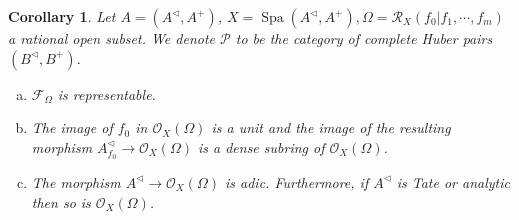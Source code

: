 \documentclass[8pt]{article}
\numberwithin{equation}{section}
\newtheorem{corollary}{Corollary} [subsection]
\DeclareMathOperator{\Hom}{Hom}
\DeclareMathOperator{\Spa}{Spa}
\newcommand{\Ouv}{\mathscr{O}}
\newcommand{\cR}[0]{\mathcal{R}}
\newcommand{\sep}[0]{\:|\:}
\newcommand{\cO}[0]{\mathcal{O}}
\newcommand{\cF}[0]{\mathcal{F}}
\begin{document}
\begin{corollary}
    \label{corollary_20_3}
    Let $A=(A^\triangleleft,A^+)$, $X=\Spa(A^\triangleleft,A^+),\Omega = \cR_X(f_0|f_1,\cdots,f_m)$ a rational open subset. %
    We denote $\mathcal{P}$ to be the category of complete Huber pairs $(B^\triangleleft,B^+)$.
    \begin{enumerate}[a.]
        \item $\cF_\Omega$ is representable.
        \item The image of $f_0$ in $\cO_X(\Omega)$ is a unit and the image of the resulting morphism $A_{f_0}^\triangleleft\to\cO_X(\Omega)$ is a dense subring of $\cO_X(\Omega)$.
        \item The morphism $A^\triangleleft\to\cO_X(\Omega)$ is adic. Furthermore, if $A^\triangleleft$ is Tate or analytic then so is $\cO_X(\Omega)$.

\end{enumerate}
\end{corollary}
\end{document}
